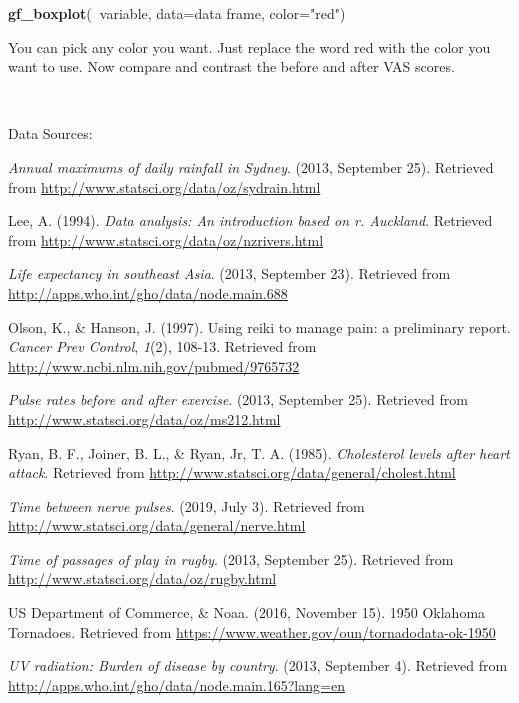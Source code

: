 \documentclass[
]{book}
\newenvironment{Shaded}{\begin{snugshade}}{\end{snugshade}}
\newcommand{\DataTypeTok}[1]{\textcolor[rgb]{0.13,0.29,0.53}{#1}}
\newcommand{\KeywordTok}[1]{\textcolor[rgb]{0.13,0.29,0.53}{\textbf{#1}}}
\newcommand{\NormalTok}[1]{#1}
\newcommand{\OperatorTok}[1]{\textcolor[rgb]{0.81,0.36,0.00}{\textbf{#1}}}
\newcommand{\StringTok}[1]{\textcolor[rgb]{0.31,0.60,0.02}{#1}}
\begin{document}
\begin{Shaded}
\begin{Highlighting}[]
\KeywordTok{gf_boxplot}\NormalTok{(}\OperatorTok{~}\NormalTok{variable, }\DataTypeTok{data=}\NormalTok{data frame, }\DataTypeTok{color=}\StringTok{"red"}\NormalTok{)}
\end{Highlighting}
\end{Shaded}

You can pick any color you want. Just replace the word red with the color you want to use.
Now compare and contrast the before and after VAS scores.

\textbf{\\
}

Data Sources:

\emph{Annual maximums of daily rainfall in Sydney}. (2013, September 25).
Retrieved from \url{http://www.statsci.org/data/oz/sydrain.html}

Lee, A. (1994). \emph{Data analysis: An introduction based on r. Auckland}.
Retrieved from \url{http://www.statsci.org/data/oz/nzrivers.html}

\emph{Life expectancy in southeast Asia}. (2013, September 23). Retrieved
from \url{http://apps.who.int/gho/data/node.main.688}

Olson, K., \& Hanson, J. (1997). Using reiki to manage pain: a
preliminary report. \emph{Cancer Prev Control}, \emph{1}(2), 108-13. Retrieved
from \url{http://www.ncbi.nlm.nih.gov/pubmed/9765732}

\emph{Pulse rates before and after exercise}. (2013, September 25). Retrieved
from \url{http://www.statsci.org/data/oz/ms212.html}

Ryan, B. F., Joiner, B. L., \& Ryan, Jr, T. A. (1985). \emph{Cholesterol
levels after heart attack}. Retrieved from
\url{http://www.statsci.org/data/general/cholest.html}

\emph{Time between nerve pulses}. (2019, July 3). Retrieved from
\url{http://www.statsci.org/data/general/nerve.html}

\emph{Time of passages of play in rugby}. (2013, September 25). Retrieved
from \url{http://www.statsci.org/data/oz/rugby.html}

US Department of Commerce, \& Noaa. (2016, November 15). 1950 Oklahoma Tornadoes. Retrieved from \url{https://www.weather.gov/oun/tornadodata-ok-1950}

\emph{UV radiation: Burden of disease by country}. (2013, September 4).
Retrieved from \url{http://apps.who.int/gho/data/node.main.165?lang=en}
\end{document}
